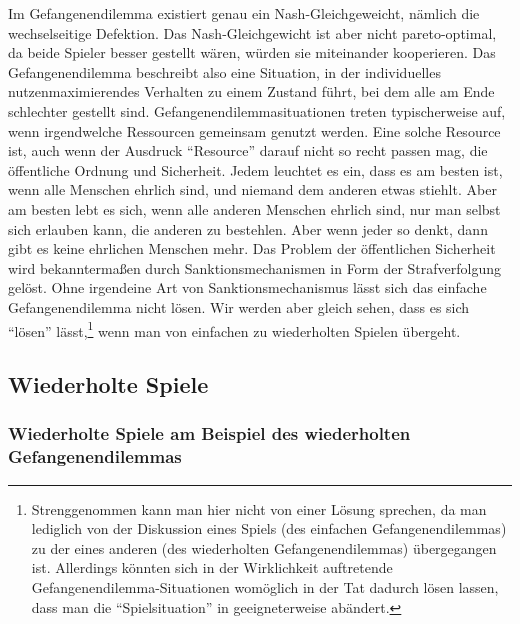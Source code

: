 Im Gefangenendilemma existiert genau ein Nash-Gleichgeweicht, nämlich die
wechselseitige Defektion. Das Nash-Gleichgewicht ist aber nicht pareto-optimal,
da beide Spieler besser gestellt wären, würden sie miteinander kooperieren. Das
Gefangenendilemma beschreibt also eine Situation, in der individuelles
nutzenmaximierendes Verhalten zu einem Zustand führt, bei dem alle am
Ende schlechter gestellt sind. Gefangenendilemmasituationen treten
typischerweise auf, wenn irgendwelche Ressourcen gemeinsam genutzt werden. Eine
solche Resource ist, auch wenn der Ausdruck "`Resource"' darauf nicht so recht
passen mag, die öffentliche Ordnung und Sicherheit. Jedem leuchtet es ein, dass
es am besten ist, wenn alle Menschen ehrlich sind, und niemand dem anderen
etwas stiehlt. Aber am besten lebt es sich, wenn alle anderen Menschen ehrlich
sind, nur man selbst sich erlauben kann, die anderen zu bestehlen. Aber wenn
jeder so denkt, dann gibt es keine ehrlichen Menschen mehr. Das Problem der
öffentlichen Sicherheit wird bekanntermaßen durch Sanktionsmechanismen in Form
der Strafverfolgung gelöst. Ohne irgendeine Art von Sanktionsmechanismus lässt
sich das einfache Gefangenendilemma nicht lösen. Wir werden aber gleich sehen,
dass es sich "`lösen"' lässt,\footnote{Strenggenommen kann man hier nicht von
einer Lösung sprechen, da man lediglich von der Diskussion eines Spiels (des
einfachen Gefangenendilemmas) zu der eines anderen (des wiederholten
Gefangenendilemmas) übergegangen ist. Allerdings könnten sich in der
Wirklichkeit auftretende Gefangenendilemma-Situationen womöglich in der Tat
dadurch lösen lassen, dass man die "`Spielsituation"' in geeigneterweise
abändert.} wenn man von einfachen zu wiederholten Spielen übergeht.

\subsection{Wiederholte Spiele}

\subsubsection{Wiederholte Spiele am Beispiel des wiederholten
Gefangenendilemmas}

